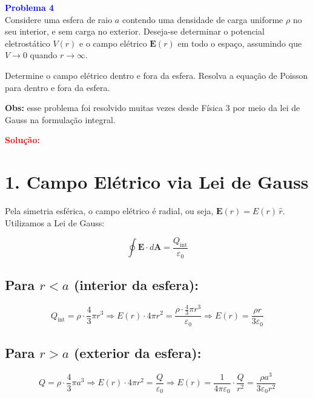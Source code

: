 \documentclass[a4paper,12pt]{article}
\begin{document}
\begin{flushleft}
\textbf{\textcolor{blue}{\Large Problema 4}}\\

Considere uma esfera de raio \( a \) contendo uma densidade de carga uniforme \( \rho \) no 
seu interior, e sem carga no exterior. Deseja-se determinar o potencial eletrostático \( V(r) \) 
e o campo elétrico \( \mathbf{E}(r) \) em todo o espaço, assumindo que \( V \rightarrow 0 \) 
quando \( r \rightarrow \infty \). 

Determine o campo elétrico dentro e fora da esfera. Resolva a equação de Poisson para dentro 
e fora da esfera.

\textbf{Obs:} esse problema foi resolvido muitas vezes desde Física 3 por meio da lei 
de Gauss na formulação integral.

\textcolor{red}{\textbf{Solução:}}\\

\section*{1. Campo Elétrico via Lei de Gauss}

Pela simetria esférica, o campo elétrico é radial, ou seja, \( \mathbf{E}(r) = E(r)\, \hat{r} \). Utilizamos a Lei de Gauss:

\begin{equation}
\boxed{\oint \mathbf{E} \cdot d\mathbf{A} = \frac{Q_{\text{int}}}{\varepsilon_0}}
\end{equation}

\subsection*{Para \( r < a \) (interior da esfera):}

\begin{equation}
Q_{\text{int}} = \rho \cdot \frac{4}{3}\pi r^3
\Rightarrow E(r) \cdot 4\pi r^2 = \frac{\rho \cdot \frac{4}{3}\pi r^3}{\varepsilon_0}
\Rightarrow \boxed{E(r) = \frac{\rho r}{3\varepsilon_0}}
\end{equation}

\subsection*{Para \( r > a \) (exterior da esfera):}

\begin{equation}
Q = \rho \cdot \frac{4}{3} \pi a^3
\Rightarrow E(r) \cdot 4\pi r^2 = \frac{Q}{\varepsilon_0}
\Rightarrow \boxed{E(r) = \frac{1}{4\pi\varepsilon_0} \cdot \frac{Q}{r^2}
= \frac{\rho a^3}{3\varepsilon_0 r^2}}
\end{equation}


\end{flushleft}
\end{document}
